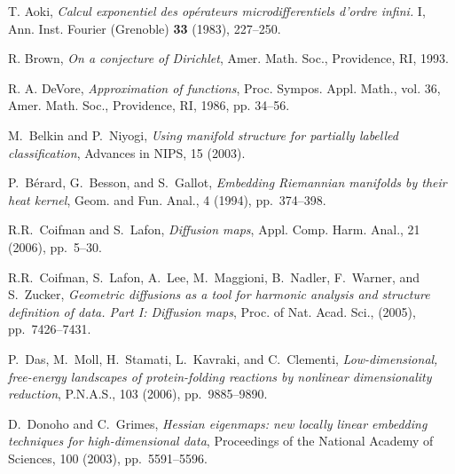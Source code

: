 \documentclass{amsart}
\theoremstyle{definition}
\theoremstyle{remark}
\numberwithin{equation}{section}
\begin{document}

\begin{thebibliography}{10}

 T. Aoki, \textit{Calcul exponentiel des op\'erateurs
microdifferentiels d'ordre infini.} I, Ann. Inst. Fourier (Grenoble)
\textbf{33} (1983), 227--250.

 R. Brown, \textit{On a conjecture of Dirichlet},
Amer. Math. Soc., Providence, RI, 1993.

 R. A. DeVore, \textit{Approximation of functions},
Proc. Sympos. Appl. Math., vol. 36,
Amer. Math. Soc., Providence, RI, 1986, pp. 34--56.









M.~Belkin and P.~Niyogi, {\em Using manifold structure for partially
  labelled classification}, Advances in NIPS, 15 (2003).

P.~B\'erard, G.~Besson, and S.~Gallot, {\em Embedding {R}iemannian
  manifolds by their heat kernel}, Geom. and Fun. Anal., 4 (1994),
  pp.~374--398.

R.R.~Coifman and S.~Lafon, {\em Diffusion maps}, Appl. Comp. Harm. Anal.,
  21 (2006), pp.~5--30.

R.R.~Coifman, S.~Lafon, A.~Lee, M.~Maggioni, B.~Nadler, F.~Warner, and
  S.~Zucker, {\em Geometric diffusions as a tool for harmonic analysis and
  structure definition of data. {P}art {I}: Diffusion maps}, Proc. of Nat.
  Acad. Sci.,  (2005), pp.~7426--7431.

P.~Das, M.~Moll, H.~Stamati, L.~Kavraki, and C.~Clementi, {\em
  Low-dimensional, free-energy landscapes of protein-folding reactions by
  nonlinear dimensionality reduction}, P.N.A.S., 103 (2006), pp.~9885--9890.

D.~Donoho and C.~Grimes, {\em Hessian eigenmaps: new locally linear
  embedding techniques for high-dimensional data}, Proceedings of the National
  Academy of Sciences, 100 (2003), pp.~5591--5596.


\end{thebibliography}
\end{document}
